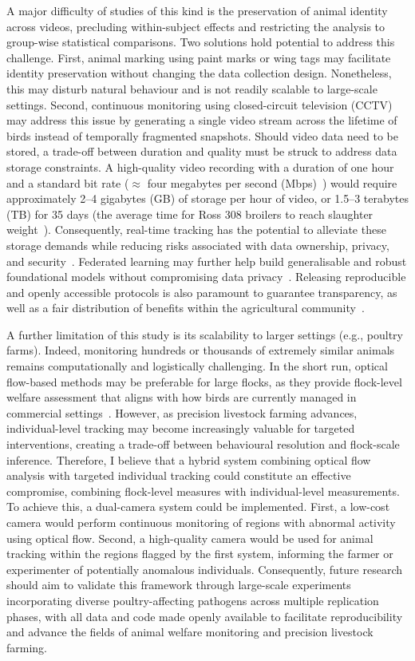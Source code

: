 A major difficulty of studies of this kind is the preservation of animal identity across videos, precluding within-subject effects and restricting the analysis to group-wise statistical comparisons. Two solutions hold potential to address this challenge. First, animal marking using paint marks or wing tags may facilitate identity preservation without changing the data collection design. Nonetheless, this may disturb natural behaviour and is not readily scalable to large-scale settings. Second, continuous monitoring using closed-circuit television (CCTV) may address this issue by generating a single video stream across the lifetime of birds instead of temporally fragmented snapshots. Should video data need to be stored, a trade-off between duration and quality must be struck to address data storage constraints. A high-quality video recording with a duration of one hour and a standard bit rate ($\approx$ four megabytes per second (Mbps)~\cite{hikvision2015}) would require approximately 2–4 gigabytes (GB) of storage per hour of video, or 1.5–3 terabytes (TB) for 35 days (the average time for Ross 308 broilers to reach slaughter weight~\cite{ross308, rspca2020}). Consequently, real-time tracking has the potential to alleviate these storage demands while reducing risks associated with data ownership, privacy, and security~\cite{wiseman2019, tzachor2022}. Federated learning may further help build generalisable and robust foundational models without compromising data privacy~\cite{khurana2025}. Releasing reproducible and openly accessible protocols is also paramount to guarantee transparency, as well as a fair distribution of benefits within the agricultural community~\cite{wiseman2019}. 

A further limitation of this study is its scalability to larger settings (e.g., poultry farms). Indeed, monitoring hundreds or thousands of extremely similar animals remains computationally and logistically challenging. In the short run, optical flow-based methods may be preferable for large flocks, as they provide flock-level welfare assessment that aligns with how birds are currently managed in commercial settings~\cite{dawkins2025}. However, as precision livestock farming advances, individual-level tracking may become increasingly valuable for targeted interventions, creating a trade-off between behavioural resolution and flock-scale inference. Therefore, I believe that a hybrid system combining optical flow analysis with targeted individual tracking could constitute an effective compromise, combining flock-level measures with individual-level measurements. To achieve this, a dual-camera system could be implemented. First, a low-cost camera would perform continuous monitoring of regions with abnormal activity using optical flow. Second, a high-quality camera would be used for animal tracking within the regions flagged by the first system, informing the farmer or experimenter of potentially anomalous individuals. Consequently, future research should aim to validate this framework through large-scale experiments incorporating diverse poultry-affecting pathogens across multiple replication phases, with all data and code made openly available to facilitate reproducibility and advance the fields of animal welfare monitoring and precision livestock farming.

